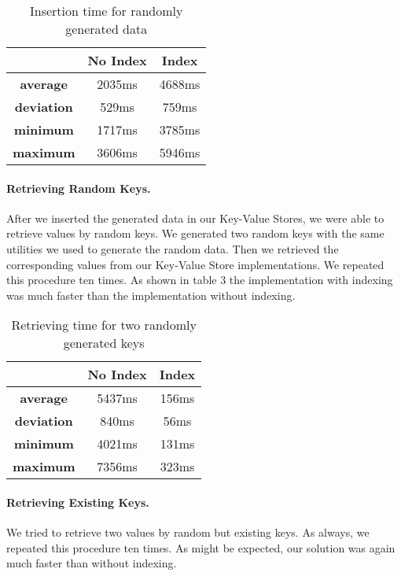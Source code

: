 \documentclass[a4paper, twocolumn,11pt]{article}
\begin{document}
\begin{table}[h]
\centering
\begin{tabular}{c c c}
\hline
 & \textbf{No Index} & \textbf{Index}\\
\hline
\textbf{average} & 2035ms & 4688ms\\
\textbf{deviation} & 529ms & 759ms\\
\textbf{minimum} & 1717ms & 3785ms\\
\textbf{maximum} & 3606ms & 5946ms\\

\hline
\end{tabular}
\caption{Insertion time for randomly generated data}
\end{table}

\paragraph{Retrieving Random Keys.} After we inserted the generated data in our Key-Value Stores, we were able to retrieve values by random keys. We generated two random keys with the same utilities we used to generate the random data. Then we retrieved the corresponding values from our Key-Value Store implementations. We repeated this procedure ten times. As shown in table 3 the implementation with indexing was much faster than the implementation without indexing.   

\begin{table}[h]
\centering
\begin{tabular}{c c c}
\hline
 & \textbf{No Index} & \textbf{Index}\\
\hline
\textbf{average} & 5437ms & 156ms\\
\textbf{deviation} & 840ms & 56ms\\
\textbf{minimum} & 4021ms & 131ms\\
\textbf{maximum} & 7356ms & 323ms\\

\hline
\end{tabular}
\caption{Retrieving time for two randomly generated keys}
\end{table}

\paragraph{Retrieving Existing Keys.} We tried to retrieve two values by random but existing keys. As always, we repeated this procedure ten times. As might be expected, our solution was again much faster than without indexing.
\end{document}
